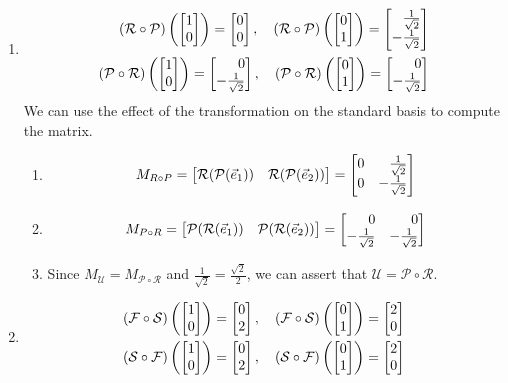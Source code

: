 \begin{exercises}
\begin{problist}
\begin{solution}
			\begin{enumerate}
				\item 
					\begin{align*}
						(\mathcal R \circ \mathcal P)\left(\mat{1\\0}\right)=\mat{0\\0},\quad
						(\mathcal R \circ \mathcal P)\left(\mat{0\\1}\right)=\mat{\tfrac{1}{\sqrt{2}}\\-\tfrac{1}{\sqrt{2}}}\\
						(\mathcal P \circ \mathcal R)\left(\mat{1\\0}\right)=\mat{0\\-\tfrac{1}{\sqrt{2}}},\quad
						(\mathcal P \circ \mathcal R)\left(\mat{0\\1}\right)=\mat{0\\-\tfrac{1}{\sqrt{2}}}
					\end{align*}
					We can use the effect of the
					transformation on the standard basis to compute the
					matrix.
					\begin{enumerate}
						\item 
							\begin{align*}
							M_{R\circ P}= \mat{\mathcal R(\mathcal
								P(\xhat))& \mathcal R( \mathcal P(\yhat))}=
							\mat{0&\tfrac{1}{\sqrt{2}}\\0&-\tfrac{1}{\sqrt{2}}}
							\end{align*}

						\item 
							\begin{align*}
							M_{P\circ R}= \mat{\mathcal P(
								\mathcal R(\xhat))& \mathcal P(\mathcal
								R(\yhat))}= \mat{0&0\\-\tfrac{1}{\sqrt{2}}&-\tfrac{1}{\sqrt{2}}}
							\end{align*}

						\item Since $M_{\mathcal U}=M_{\mathcal P
							\circ \mathcal R}$ and $\tfrac{1}{\sqrt{2}}=\tfrac{\sqrt{2}}{2}$,
							we can assert that
							$\mathcal U=\mathcal P \circ
							\mathcal R$.
					\end{enumerate}

				\item
					\begin{align*}
						(\mathcal F \circ \mathcal S)\left(\mat{1\\0}\right) = \mat{0\\2},\quad
						(\mathcal F \circ \mathcal S)\left(\mat{0\\1}\right) = \mat{2\\0}\\
						(\mathcal S \circ \mathcal F)\left(\mat{1\\0}\right) = \mat{0\\2},\quad
						(\mathcal S \circ \mathcal F)\left(\mat{0\\1}\right) = \mat{2\\0}
					\end{align*}
					

\end{enumerate}
\end{solution}
\end{problist}
\end{exercises}
